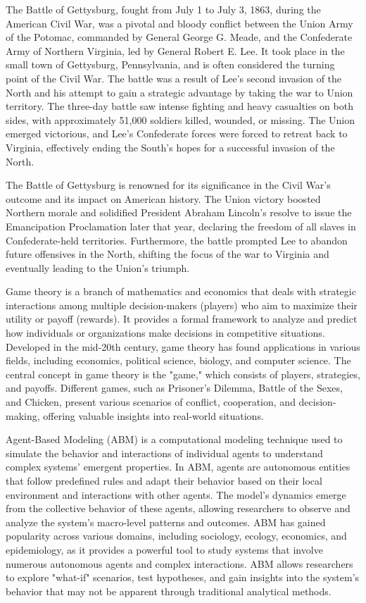 \documentclass[final,5p,times,twocolumn,authoryear]{elsarticle}
\begin{document}
The Battle of Gettysburg, fought from July 1 to July 3, 1863, during the American Civil War, was a pivotal and bloody conflict between the Union Army of the Potomac, commanded by General George G. Meade, and the Confederate Army of Northern Virginia, led by General Robert E. Lee. It took place in the small town of Gettysburg, Pennsylvania, and is often considered the turning point of the Civil War. The battle was a result of Lee's second invasion of the North and his attempt to gain a strategic advantage by taking the war to Union territory. The three-day battle saw intense fighting and heavy casualties on both sides, with approximately 51,000 soldiers killed, wounded, or missing. The Union emerged victorious, and Lee's Confederate forces were forced to retreat back to Virginia, effectively ending the South's hopes for a successful invasion of the North.

The Battle of Gettysburg is renowned for its significance in the Civil War's outcome and its impact on American history. The Union victory boosted Northern morale and solidified President Abraham Lincoln's resolve to issue the Emancipation Proclamation later that year, declaring the freedom of all slaves in Confederate-held territories. Furthermore, the battle prompted Lee to abandon future offensives in the North, shifting the focus of the war to Virginia and eventually leading to the Union's triumph.

Game theory is a branch of mathematics and economics that deals with strategic interactions among multiple decision-makers (players) who aim to maximize their utility or payoff (rewards). It provides a formal framework to analyze and predict how individuals or organizations make decisions in competitive situations. Developed in the mid-20th century, game theory has found applications in various fields, including economics, political science, biology, and computer science. The central concept in game theory is the "game," which consists of players, strategies, and payoffs. Different games, such as Prisoner's Dilemma, Battle of the Sexes, and Chicken, present various scenarios of conflict, cooperation, and decision-making, offering valuable insights into real-world situations.

Agent-Based Modeling (ABM) is a computational modeling technique used to simulate the behavior and interactions of individual agents to understand complex systems' emergent properties. In ABM, agents are autonomous entities that follow predefined rules and adapt their behavior based on their local environment and interactions with other agents. The model's dynamics emerge from the collective behavior of these agents, allowing researchers to observe and analyze the system's macro-level patterns and outcomes. ABM has gained popularity across various domains, including sociology, ecology, economics, and epidemiology, as it provides a powerful tool to study systems that involve numerous autonomous agents and complex interactions. ABM allows researchers to explore "what-if" scenarios, test hypotheses, and gain insights into the system's behavior that may not be apparent through traditional analytical methods.
\end{document}

